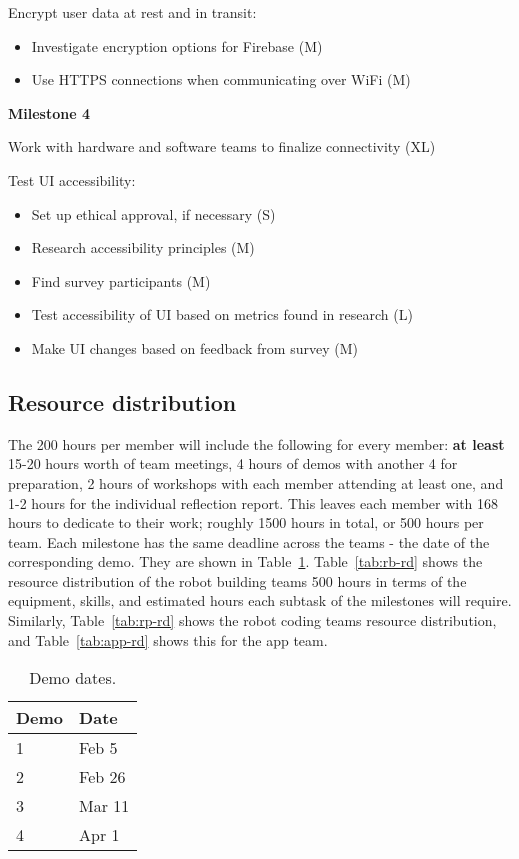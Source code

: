 \documentclass{article}
\begin{document}
Encrypt user data at rest and in transit:
\begin{itemize}
\item Investigate encryption options for Firebase (M)
\item Use HTTPS connections when communicating over WiFi (M)
\end{itemize}

{\bf Milestone 4}

Work with hardware and software teams to finalize connectivity (XL)

Test UI accessibility:
\begin{itemize}
\item Set up ethical approval, if necessary (S)
\item Research accessibility principles (M)
\item Find survey participants (M)
\item Test accessibility of UI based on metrics found in research (L)
\item Make UI changes based on feedback from survey (M)
\end{itemize}

\subsection{Resource distribution}

The 200 hours per member will include the following for every member: {\bf at least} 15-20 hours worth of team meetings, 4 hours of demos with another 4 for preparation, 2 hours of workshops with each member attending at least one, and 1-2 hours for the individual reflection report. This leaves each member with 168 hours to dedicate to their work; roughly 1500 hours in total, or 500 hours per team. Each milestone has the same deadline across the teams - the date of the corresponding demo. They are shown in Table~\ref{tab:demo-dates}. Table~\ref{tab:rb-rd} shows the resource distribution of the robot building teams 500 hours in terms of the equipment, skills, and estimated hours each subtask of the milestones will require. Similarly, Table~\ref{tab:rp-rd} shows the robot coding teams resource distribution, and Table~\ref{tab:app-rd} shows this for the app team.
\begin{table}[]
  \begin{center}
  \begin{tabular}{ll}
    \hline
    Demo & Date   \\
    \hline
    1 & Feb 5 \\
    2 & Feb 26 \\
    3 & Mar 11 \\
    4 & Apr 1\\ \hline
  \end{tabular}
  \end{center}
  \caption{Demo dates.}
  \label{tab:demo-dates}
\end{table}
\end{document}
